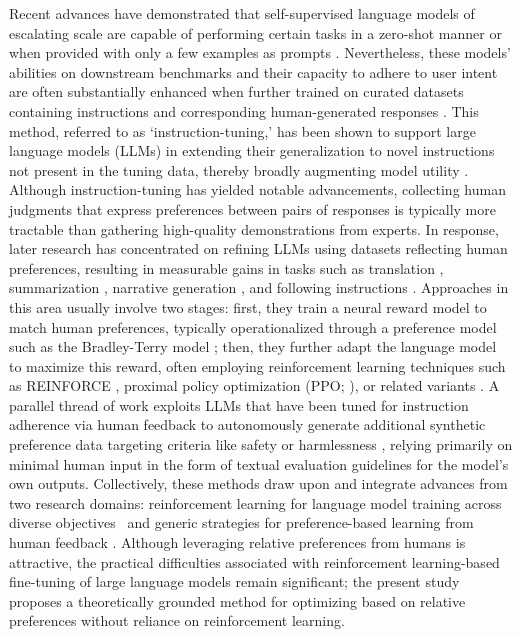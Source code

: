 Recent advances have demonstrated that self-supervised language models of escalating scale are capable of performing certain tasks in a zero-shot manner \citep{radford2019language} or when provided with only a few examples as prompts \citep{gpt3,megatron,chowdhery2022palm}. Nevertheless, these models' abilities on downstream benchmarks and their capacity to adhere to user intent are often substantially enhanced when further trained on curated datasets containing instructions and corresponding human-generated responses \citep{mishra-etal-2022-cross,sanh2022multitask,chung2022scaling,thoppilan2022lamda}. This method, referred to as ‘instruction-tuning,’ has been shown to support large language models (LLMs) in extending their generalization to novel instructions not present in the tuning data, thereby broadly augmenting model utility \citep{chung2022scaling}. Although instruction-tuning has yielded notable advancements, collecting human judgments that express preferences between pairs of responses is typically more tractable than gathering high-quality demonstrations from experts. In response, later research has concentrated on refining LLMs using datasets reflecting human preferences, resulting in measurable gains in tasks such as translation \citep{kreutzer-etal-2018-reliability}, summarization \citep{stiennon2022learning,ziegler2020finetuning}, narrative generation \citep{ziegler2020finetuning}, and following instructions \citep{ouyang2022training,ramamurthy2023is}. Approaches in this area usually involve two stages: first, they train a neural reward model to match human preferences, typically operationalized through a preference model such as the Bradley-Terry model \citep{bradley1952rankanalysis}; then, they further adapt the language model to maximize this reward, often employing reinforcement learning techniques such as REINFORCE \citep{williams1992reinforce}, proximal policy optimization (PPO; \cite{schulman2017proximal}), or related variants \citep{ramamurthy2023is}. A parallel thread of work exploits LLMs that have been tuned for instruction adherence via human feedback to autonomously generate additional synthetic preference data targeting criteria like safety or harmlessness \citep{bai2022constitutional}, relying primarily on minimal human input in the form of textual evaluation guidelines for the model’s own outputs. Collectively, these methods draw upon and integrate advances from two research domains: reinforcement learning for language model training across diverse objectives~\citep{Ranzato2015SequenceLT,paulus2018a,wu2018learning} and generic strategies for preference-based learning from human feedback \citep{christiano2017deep,kupcsik2018learning}. Although leveraging relative preferences from humans is attractive, the practical difficulties associated with reinforcement learning-based fine-tuning of large language models remain significant; the present study proposes a theoretically grounded method for optimizing based on relative preferences without reliance on reinforcement learning.

